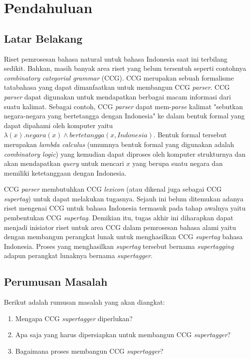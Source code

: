 \chapter{Pendahuluan}
\section{Latar Belakang}

Riset pemrosesan bahasa natural untuk bahasa Indonesia saat ini terbilang sedikit.
Bahkan, masih banyak area riset yang belum tersentuh seperti contohnya
\textit{combinatory categorial grammar} (CCG).
CCG merupakan sebuah formalisme tatabahasa yang dapat dimanfaatkan untuk membangun CCG \textit{parser}.
CCG \textit{parser} dapat digunakan untuk mendapatkan berbagai macam informasi dari suatu kalimat.
Sebagai contoh, CCG \textit{parser} dapat mem-\textit{parse} kalimat
"sebutkan negara-negara yang bertetangga dengan Indonesia" ke dalam bentuk formal yang dapat dipahami
oleh komputer yaitu $\lambda{(x). negara(x) \land bertetangga(x, Indonesia)}$.
Bentuk formal tersebut merupakan \textit{lambda calculus}
(umumnya bentuk formal yang digunakan adalah \textit{combinatory logic}) yang kemudian dapat diproses
oleh komputer strukturnya dan akan mendapatkan \textit{query} untuk mencari $x$ yang berupa
suatu negara dan memiliki ketetanggaan dengan Indonesia.

CCG \textit{parser} membutuhkan CCG \textit{lexicon} (atau dikenal juga sebagai CCG \textit{supertag})
untuk dapat melakukan tugasnya. Sejauh ini belum ditemukan adanya riset mengenai CCG untuk
bahasa Indonesia termasuk pada tahap awalnya yaitu pembentukan CCG \textit{supertag}.
Demikian itu, tugas akhir ini diharapkan dapat menjadi inisiator riset untuk area CCG dalam
pemrosesan bahasa alami yaitu dengan membangun perangkat lunak untuk menghasilkan CCG \textit{supertag}
bahasa Indonesia. Proses yang menghasilkan \textit{supertag} tersebut bernama \textit{supertagging}
adapun perangkat lunaknya bernama \textit{supertagger}.

\section{Perumusan Masalah}
Berikut adalah rumusan masalah yang akan diangkat:
\begin{enumerate}
    \item Mengapa CCG \textit{supertagger} diperlukan?
    \item Apa saja yang harus dipersiapkan untuk membangun CCG \textit{supertagger}?
    \item Bagaimana proses membangun CCG \textit{supertagger}?
\end{enumerate}
